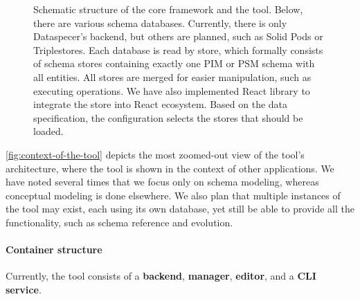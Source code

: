 {\begin{figure}
    \caption{Schematic structure of the core framework and the tool. Below, there are various schema databases. Currently, there is only Dataspecer's backend, but others are planned, such as Solid Pods or Triplestores. Each database is read by store, which formally consists of schema stores containing exactly one PIM or PSM schema with all entities. All stores are merged for easier manipulation, such as executing operations. We have also implemented React library to integrate the store into React ecosystem. Based on the data specification, the configuration selects the stores that should be loaded.} \label{fig:schematic}
\end{figure}
\clearpage
}

\bigskip

\autoref{fig:context-of-the-tool} depicts the most zoomed-out view of the tool’s architecture, where the tool is shown in the context of other applications. We have noted several times that we focus only on schema modeling, whereas conceptual modeling is done elsewhere. We also plan that multiple instances of the tool may exist, each using its own database, yet still be able to provide all the functionality, such as schema reference and evolution.

\paragraph{Container structure} Currently, the tool consists of a \textbf{backend}, \textbf{manager}, \textbf{editor}, and a \textbf{CLI service}.

